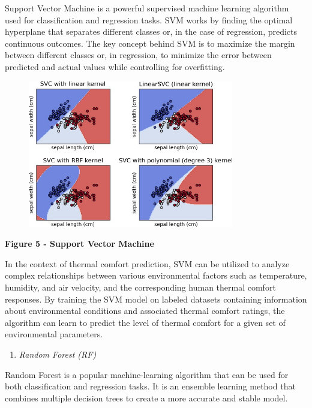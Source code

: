 Support Vector Machine is a powerful supervised machine learning
algorithm used for classification and regression tasks. SVM works by
finding the optimal hyperplane that separates different classes or, in
the case of regression, predicts continuous outcomes. The key concept
behind SVM is to maximize the margin between different classes or, in
regression, to minimize the error between predicted and actual values
while controlling for overfitting.

\begin{figure}[H]
	\centering
	\includegraphics[width=0.8\textwidth]{media/ict/image21}
	\caption*{}
\end{figure}


{\bfseries Figure 5 - Support Vector Machine}

In the context of thermal comfort prediction, SVM can be utilized to
analyze complex relationships between various environmental factors such
as temperature, humidity, and air velocity, and the corresponding human
thermal comfort responses. By training the SVM model on labeled datasets
containing information about environmental conditions and associated
thermal comfort ratings, the algorithm can learn to predict the level of
thermal comfort for a given set of environmental parameters.

\begin{enumerate}
\def\labelenumi{\Alph{enumi}.}
\setcounter{enumi}{6}
\item
  \emph{Random Forest (RF)}
\end{enumerate}

Random Forest is a popular machine-learning algorithm that can be used
for both classification and regression tasks. It is an ensemble learning
method that combines multiple decision trees to create a more accurate
and stable model.

